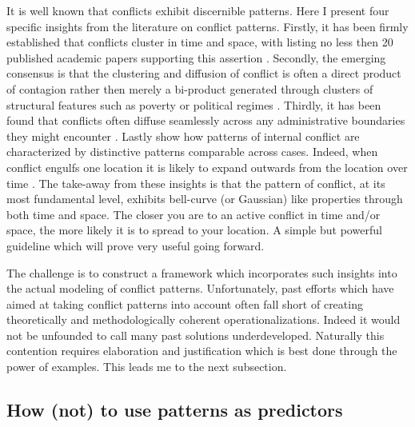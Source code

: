\documentclass[a4paper]{article}
\begin{document}
It is well known that conflicts exhibit discernible patterns. Here I present four specific insights from the literature on conflict patterns. Firstly, it has been firmly established that conflicts cluster in time and space, with \cite{crost2015conflict} listing no less then 20 published academic papers supporting this assertion \citep[15]{crost2015conflict}. Secondly, the emerging consensus is that the clustering and diffusion of conflict is often a direct product of contagion rather then merely a bi-product generated through clusters of structural features such as poverty or political regimes \citep{buhaug2008contagion,schutte2011diffusion,crost2015conflict,bara_2017}. Thirdly, it has been found that conflicts often diffuse seamlessly across any administrative boundaries they might encounter \cite[442-443]{ol2010afghanistan}. Lastly \cite{schutte2011diffusion} show how patterns of internal conflict are characterized by distinctive patterns comparable across cases. Indeed, when conflict engulfs one location it is likely to expand outwards from the location over time \citep[151]{schutte2011diffusion}. The take-away from these insights is that the pattern of conflict, at its most fundamental level, exhibits bell-curve (or Gaussian) like properties through both time and space. The closer you are to an active conflict in time and/or space, the more likely it is to spread to your location. A simple but powerful guideline which will prove very useful going forward.\par

The challenge is to construct a framework which incorporates such insights into the actual modeling of conflict patterns. Unfortunately, past efforts which have aimed at taking conflict patterns into account often fall short of creating theoretically and methodologically coherent operationalizations. Indeed it would not be unfounded to call many past solutions underdeveloped. Naturally this contention requires elaboration and justification which is best done through the power of examples. This leads me to the next subsection.\par

\subsection{How (not) to use patterns as predictors}
\end{document}
